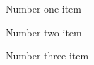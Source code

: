 \documentclass{article}
\begin{document}
\begin{enumerate*}
	\item  Number one item
	\item  Number two item
	\item  Number three item
\end{enumerate*}
\end{document}
